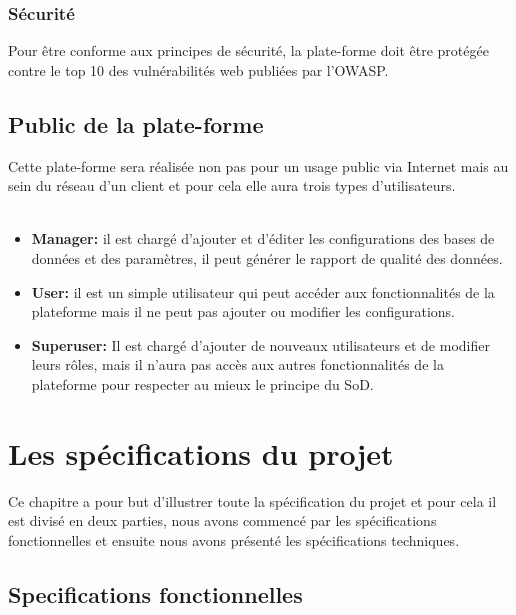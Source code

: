 \documentclass[oneside]{book}
\begin{document}
\subsection{Sécurité}
Pour être conforme aux principes de sécurité, la plate-forme doit être protégée contre le top 10 des vulnérabilités web publiées par l'OWASP.

\section{Public de la plate-forme}
Cette plate-forme sera réalisée non pas pour un usage public via Internet mais au sein du réseau d'un client et pour cela elle aura trois types d'utilisateurs.\\
\\
    \begin{itemize}
        \item \textbf{Manager:} il est chargé d'ajouter et d'éditer les configurations des bases de données et des paramètres, il peut générer le rapport de qualité des données.
        \\
        \item \textbf{User:} il est un simple utilisateur qui peut accéder aux fonctionnalités de la plateforme mais il ne peut pas ajouter ou modifier les configurations.
        \\
        \item \textbf{Superuser:} Il est chargé d'ajouter de nouveaux utilisateurs et de modifier leurs rôles, mais il n'aura pas accès aux autres fonctionnalités de la plateforme pour respecter au mieux le principe du SoD.
    \end{itemize}
\chapter{Les spécifications du projet}

Ce chapitre a pour but d'illustrer toute la spécification du projet et pour cela il est divisé en deux parties, nous avons commencé par les spécifications fonctionnelles et ensuite nous avons présenté les spécifications techniques.

\section{Specifications fonctionnelles} 
\end{document}

